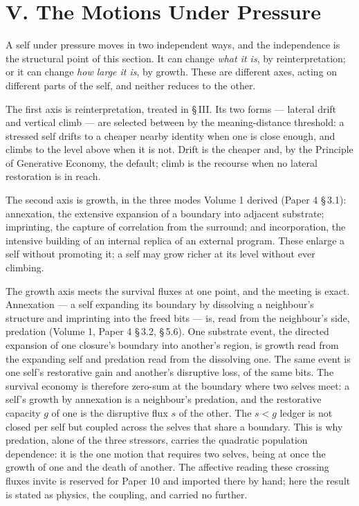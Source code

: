 \documentclass[11pt,oneside]{report}
\theoremstyle{definition}
\theoremstyle{remark}
\begin{document}
\section*{V. The Motions Under Pressure}

A self under pressure moves in two independent ways, and the independence is the structural point of this section. It can change \emph{what it is}, by reinterpretation; or it can change \emph{how large it is}, by growth. These are different axes, acting on different parts of the self, and neither reduces to the other.

The first axis is reinterpretation, treated in \S\,III. Its two forms --- lateral drift and vertical climb --- are selected between by the meaning-distance threshold: a stressed self drifts to a cheaper nearby identity when one is close enough, and climbs to the level above when it is not. Drift is the cheaper and, by the Principle of Generative Economy, the default; climb is the recourse when no lateral restoration is in reach.

The second axis is growth, in the three modes Volume 1 derived (Paper 4 \S\,3.1): annexation, the extensive expansion of a boundary into adjacent substrate; imprinting, the capture of correlation from the surround; and incorporation, the intensive building of an internal replica of an external program. These enlarge a self without promoting it; a self may grow richer at its level without ever climbing.

The growth axis meets the survival fluxes at one point, and the meeting is exact. Annexation --- a self expanding its boundary by dissolving a neighbour's structure and imprinting into the freed bits --- is, read from the neighbour's side, predation (Volume 1, Paper 4 \S\,3.2, \S\,5.6). One substrate event, the directed expansion of one closure's boundary into another's region, is growth read from the expanding self and predation read from the dissolving one. The same event is one self's restorative gain and another's disruptive loss, of the same bits. The survival economy is therefore zero-sum at the boundary where two selves meet: a self's growth by annexation is a neighbour's predation, and the restorative capacity \ensuremath{g} of one is the disruptive flux \ensuremath{s} of the other. The \ensuremath{s < g} ledger is not closed per self but coupled across the selves that share a boundary. This is why predation, alone of the three stressors, carries the quadratic population dependence: it is the one motion that requires two selves, being at once the growth of one and the death of another. The affective reading these crossing fluxes invite is reserved for Paper 10 and imported there by hand; here the result is stated as physics, the coupling, and carried no further.
\end{document}
